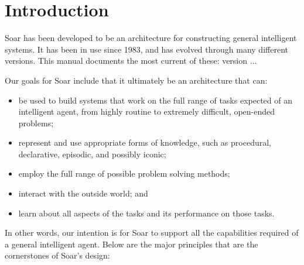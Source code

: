 \chapter{Introduction}
\label{INTRO}

Soar has been developed to be an architecture for constructing general
intelligent systems. It has been in use since 1983, and has evolved through
many different versions. This manual documents the most current of these:
version \SoarVersionMajor.\SoarVersionMinor.\SoarVersionRevision.

Our goals for Soar include that it ultimately be an architecture that can: \vspace{-12pt}

\begin{itemize}
\item be used to build systems that work on the full range of tasks expected
	of an \linebreak intelligent agent, from highly routine to extremely difficult,
	open-ended problems;\vspace{-6pt}
\item represent and use appropriate forms of knowledge, such as procedural,
	declarative, episodic, and possibly iconic;\vspace{-6pt}
\item employ the full range of possible problem solving methods;\vspace{-6pt}
\item interact with the outside world; and\vspace{-6pt}
\item learn about all aspects of the tasks and its performance on those tasks.
\end{itemize}

In other words, our intention is for Soar to support all the capabilities
required of a general intelligent agent. Below are the major principles that
are the cornerstones of Soar's design:  \vspace{-12pt}

